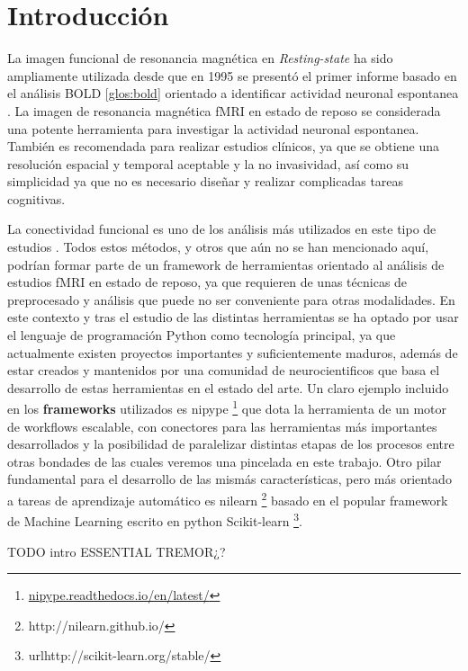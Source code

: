 \chapter{Introducción}

La imagen funcional de resonancia magnética en \textit{Resting-state} ha sido ampliamente utilizada desde que en 1995 se presentó el primer informe basado en el análisis BOLD \ref{glos:bold} orientado a identificar actividad neuronal espontanea \cite{mattoolbox}. La imagen de resonancia magnética fMRI en estado de reposo se considerada una potente herramienta para investigar la actividad neuronal espontanea. También es recomendada para realizar estudios clínicos, ya que se obtiene una resolución espacial y temporal aceptable y la no invasividad, así como su simplicidad ya que no es necesario diseñar y realizar complicadas tareas cognitivas.

La conectividad funcional es uno de los análisis más utilizados en este tipo de estudios \cite{biswal,heuvel}. Todos estos métodos, y otros que aún no se han mencionado aquí, podrían formar parte de un framework de herramientas orientado al análisis de estudios fMRI en estado de reposo, ya que requieren de unas técnicas de preprocesado y análisis que puede no ser conveniente para otras modalidades. En este contexto y tras el estudio de las distintas herramientas se ha optado por usar el lenguaje de programación Python como tecnología principal, ya que actualmente existen proyectos importantes y suficientemente maduros, además de estar creados y mantenidos por una comunidad de neurocientificos que basa el desarrollo de estas herramientas en el estado del arte. Un claro ejemplo incluido en los \textbf{frameworks} utilizados es nipype \footnote{\url{nipype.readthedocs.io/en/latest/}} que dota la herramienta de un motor de workflows escalable, con conectores para las herramientas más importantes desarrollados y la posibilidad de paralelizar distintas etapas de los procesos entre otras bondades de las cuales veremos una pincelada en este trabajo. Otro pilar fundamental para el desarrollo de las mismás características, pero más orientado a tareas de aprendizaje automático es nilearn \footnote{http://nilearn.github.io/} basado en el popular framework de Machine Learning escrito en python Scikit-learn \footnote{url{http://scikit-learn.org/stable/}}.

TODO intro ESSENTIAL TREMOR¿? 
